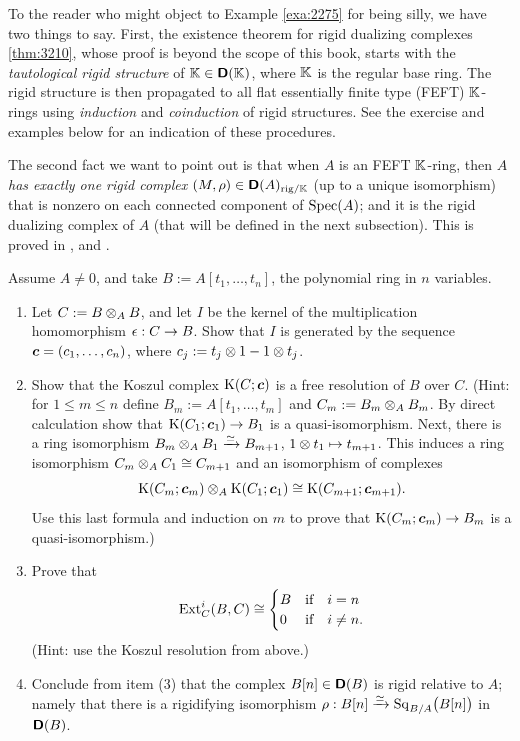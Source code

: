 \begin{rem} \label{rem:3120}
To the reader who might object to Example \ref{exa:2275} for being silly, 
we have two things to say. First, the existence theorem for rigid dualizing 
complexes \ref{thm:3210}, whose proof is beyond the scope of this book, starts  
with the {\em tautological rigid structure} of $\mathbb{K} \in \boldsymbol{\mathsf{D}}(\mathbb{K})$, where 
$\mathbb{K}$ is the regular base ring. The rigid structure is then propagated to all 
flat essentially finite type (FEFT) $\mathbb{K}$-rings using {\em induction} and {\em 
coinduction} of rigid structures. See the exercise and examples below for an 
indication of these procedures. 

The second fact we want to point out is that when $A$ is an FEFT $\mathbb{K}$-ring, 
then {\em $A$ has exactly one rigid complex} 
$(M, \rho) \in \boldsymbol{\mathsf{D}}(A)_{\mathrm{rig} / \mathbb{K}}$ (up to a unique isomorphism) 
that is nonzero on each connected component of $\operatorname{Spec}(A)$; and it is the 
rigid dualizing complex of $A$ (that will be defined in the next subsection). 
This is proved in \cite{YeZh3}, \cite{AIL} and \cite{Sha3}. 
\end{rem}

\begin{exer} \label{exer:2395}
Assume $A \neq 0$, and take $B := A[t_1, \ldots, t_n]$, the polynomial ring in 
$n$ variables. 
\begin{enumerate}
\item Let $C := B \otimes_A B$, and let $I$ be the kernel of the multiplication 
homomorphism $\epsilon : C \to B$. Show that $I$ is generated by the sequence 
$\boldsymbol{c} = (c_1, \ldots, c_n)$, where 
$c_j := t_j \otimes 1 - 1 \otimes t_j$. 

\item Show that the Koszul complex 
$\operatorname{K}(C; \boldsymbol{c})$ is a free resolution of $B$ over $C$. 
(Hint: for $1 \leq m \leq n$ define 
$B_m := A[t_1, \ldots, t_m]$ and 
$C_m := B_m \otimes_A B_m$. 
By  direct calculation show that 
$\operatorname{K}(C_1; \boldsymbol{c}_1) \to B_1$
is a quasi-isomorphism. Next, there is a ring isomorphism 
$B_m \otimes_A B_1 \xrightarrow{\simeq} B_{m + 1}$, 
$1 \otimes t_1 \mapsto t_{m + 1}$.
This induces a ring isomorphism 
$C_m \otimes_A C_1 \cong C_{m + 1}$ 
and an isomorphism of complexes 
\[ \operatorname{K}(C_m; \boldsymbol{c}_m) \otimes_A \operatorname{K}(C_1; \boldsymbol{c}_1)
\cong \operatorname{K}(C_{m + 1}; \boldsymbol{c}_{m + 1}) . \]
Use this last formula and induction on $m$ to prove that 
$\operatorname{K}(C_m; \boldsymbol{c}_m) \to B_m$ 
is a quasi-isomorphism.)

\item  Prove that 
\[ \operatorname{Ext}^i_{C}(B, C) \cong 
\begin{cases}
B & \textup{if} \quad i = n \\
0 & \textup{if} \quad i \neq n  . 
\end{cases} \]
(Hint: use the Koszul resolution from above.)

\item Conclude from item (3) that the complex $B[n] \in \boldsymbol{\mathsf{D}}(B)$ is rigid 
relative to $A$; namely that there is a rigidifying isomorphism 
$\rho : B[n] \xrightarrow{\simeq} \operatorname{Sq}_{B / A} \bigl( B[n] \bigr)$
in $\boldsymbol{\mathsf{D}}(B)$. 
\end{enumerate}
\end{exer}

